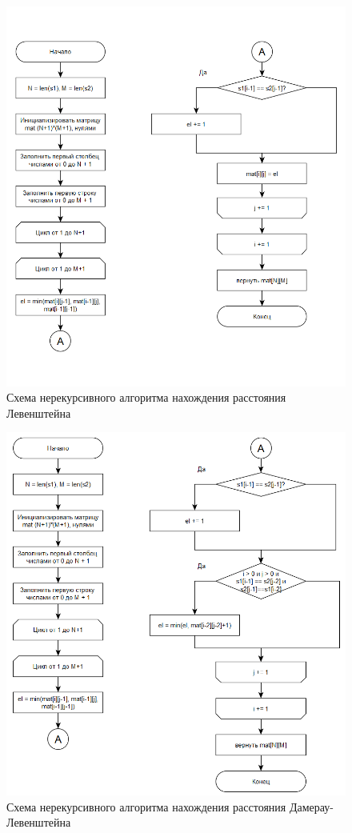 \documentclass{article}
\begin{document}
\begin{figure}[h]
	\centering
	\includegraphics[scale=0.9]{tools/alg_3.png}
	\caption{Схема нерекурсивного алгоритма нахождения расстояния Левенштейна}
	\label{fig:lev}
\end{figure}

\begin{figure}[h]
	\centering
	\includegraphics[scale=0.9]{tools/alg_4.png}
	\caption{Схема нерекурсивного алгоритма нахождения расстояния Дамерау-Левенштейна}
	\label{fig:dlev}
\end{figure}
\end{document}
